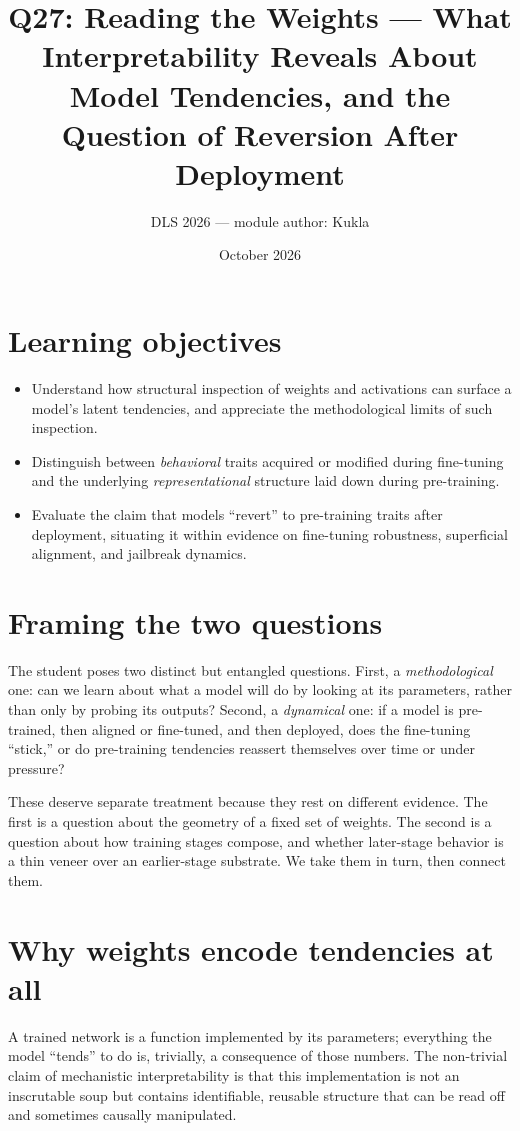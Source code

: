 \documentclass[11pt]{article}
\title{Q27: Reading the Weights --- What Interpretability Reveals About Model Tendencies, and the Question of Reversion After Deployment}
\author{DLS 2026 --- module author: Kukla}
\date{October 2026}
\begin{document}
\maketitle

\section*{Learning objectives}
\begin{itemize}[leftmargin=*]
  \item Understand how structural inspection of weights and activations can surface a model's latent tendencies, and appreciate the methodological limits of such inspection.
  \item Distinguish between \emph{behavioral} traits acquired or modified during fine-tuning and the underlying \emph{representational} structure laid down during pre-training.
  \item Evaluate the claim that models ``revert'' to pre-training traits after deployment, situating it within evidence on fine-tuning robustness, superficial alignment, and jailbreak dynamics.
\end{itemize}

\section{Framing the two questions}
The student poses two distinct but entangled questions. First, a \emph{methodological} one: can we learn about what a model will do by looking at its parameters, rather than only by probing its outputs? Second, a \emph{dynamical} one: if a model is pre-trained, then aligned or fine-tuned, and then deployed, does the fine-tuning ``stick,'' or do pre-training tendencies reassert themselves over time or under pressure?

These deserve separate treatment because they rest on different evidence. The first is a question about the geometry of a fixed set of weights. The second is a question about how training stages compose, and whether later-stage behavior is a thin veneer over an earlier-stage substrate. We take them in turn, then connect them.

\section{Why weights encode tendencies at all}
A trained network is a function implemented by its parameters; everything the model ``tends'' to do is, trivially, a consequence of those numbers. The non-trivial claim of mechanistic interpretability is that this implementation is not an inscrutable soup but contains identifiable, reusable structure that can be read off and sometimes causally manipulated.
\end{document}
